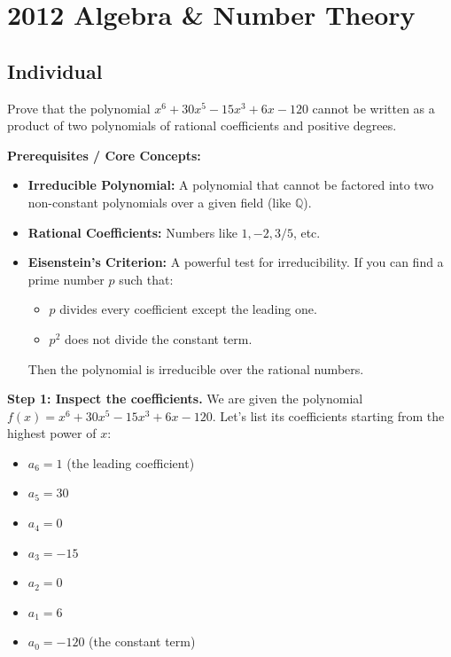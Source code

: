 \section{2012 Algebra \& Number Theory}

\subsection*{Individual}
\begin{exercise}
\label{algebra:2012:1}
Prove that the polynomial $x^6 + 30x^5 - 15x^3 + 6x - 120$ cannot be written as a product of two polynomials of rational coefficients and positive degrees.
\end{exercise}

\begin{solution}
\textbf{Prerequisites / Core Concepts:}
\begin{itemize}
    \item \textbf{Irreducible Polynomial:} A polynomial that cannot be factored into two non-constant polynomials over a given field (like $\mathbb{Q}$).
    \item \textbf{Rational Coefficients:} Numbers like $1, -2, 3/5$, etc.
    \item \textbf{Eisenstein's Criterion:} A powerful test for irreducibility. If you can find a prime number $p$ such that:
    \begin{itemize}
        \item $p$ divides every coefficient except the leading one.
        \item $p^2$ does not divide the constant term.
    \end{itemize}
    Then the polynomial is irreducible over the rational numbers.
\end{itemize}

\textbf{Step 1: Inspect the coefficients.}
We are given the polynomial $f(x) = x^6 + 30x^5 - 15x^3 + 6x - 120$. Let's list its coefficients starting from the highest power of $x$:
\begin{itemize}
    \item $a_6 = 1$ (the leading coefficient)
    \item $a_5 = 30$
    \item $a_4 = 0$
    \item $a_3 = -15$
    \item $a_2 = 0$
    \item $a_1 = 6$
    \item $a_0 = -120$ (the constant term)
\end{itemize}


\end{solution}
